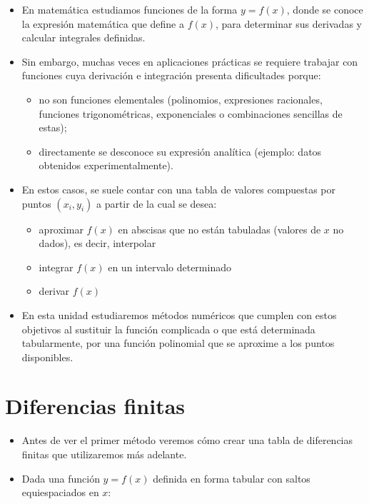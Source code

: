 \documentclass[openany]{book}
\providecommand{\tightlist}{%
  \setlength{\itemsep}{0pt}\setlength{\parskip}{0pt}}
\begin{document}
\begin{itemize}
\item
  En matemática estudiamos funciones de la forma \(y = f(x)\), donde se conoce la expresión matemática que define a \(f(x)\), para determinar sus derivadas y calcular integrales definidas.
\item
  Sin embargo, muchas veces en aplicaciones prácticas se requiere trabajar con funciones cuya derivación e integración presenta dificultades porque:

  \begin{itemize}
  \tightlist
  \item
    no son funciones elementales (polinomios, expresiones racionales, funciones trigonométricas, exponenciales o combinaciones sencillas de estas);
  \item
    directamente se desconoce su expresión analítica (ejemplo: datos obtenidos experimentalmente).
  \end{itemize}
\item
  En estos casos, se suele contar con una tabla de valores compuestas por puntos \((x_i, y_i)\) a partir de la cual se desea:

  \begin{itemize}
  \tightlist
  \item
    aproximar \(f(x)\) en abscisas que no están tabuladas (valores de \(x\) no dados), es decir, interpolar
  \item
    integrar \(f(x)\) en un intervalo determinado
  \item
    derivar \(f(x)\)
  \end{itemize}
\item
  En esta unidad estudiaremos métodos numéricos que cumplen con estos objetivos al sustituir la función complicada o que está determinada tabularmente, por una función polinomial que se aproxime a los puntos disponibles.
\end{itemize}

\hypertarget{diferencias-finitas}{%
\section{Diferencias finitas}\label{diferencias-finitas}}

\begin{itemize}
\tightlist
\item
  Antes de ver el primer método veremos cómo crear una tabla de diferencias finitas que utilizaremos más adelante.
\item
  Dada una función \(y = f(x)\) definida en forma tabular con saltos equiespaciados en \(x\):
\end{itemize}
\end{document}
